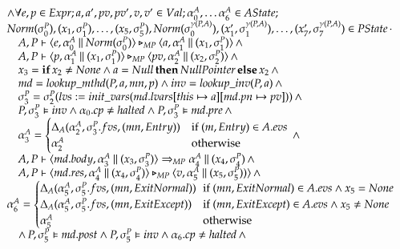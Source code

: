 \documentclass[a4paper,10pt]{article}
\begin{document}
\begin{displaymath}
\begin{array}{l}
\wedge
\forall e,p \in Expr; a,a',pv,pv',v,v' \in Val; \alpha^A_0,\ldots\alpha^A_6 \in AState;\\
Norm(\sigma_0^P),(x_1,\sigma_1^P), \ldots, (x_5, \sigma^P_5), Norm(\sigma_0^{\gamma(P,A)}), (x'_1,\sigma_1^{\gamma(P,A)}),\ldots,(x'_7,\sigma^{\gamma(P,A)}_7) \in PState
\,\cdot\\
\quad A, P \vdash \langle e,\alpha_0^A \mathbin{\|} Norm(\sigma_0^P) \rangle \triangleright_{MP} \langle a, \alpha^A_1 \mathbin{\|} (x_1, \sigma_1^P) \rangle \,\wedge\\
\quad A, P \vdash \langle p, \alpha^A_1 \mathbin{\|} (x_1, \sigma_1^P) \rangle \triangleright_{MP} \langle pv, \alpha^A_2 \mathbin{\|} (x_2, \sigma^P_2) \rangle \,\wedge\\
\quad x_3 = \textbf{if}\, x_2 \neq None \wedge a = Null\, \textbf{then}\, NullPointer\, \textbf{else}\, x_2 \,\wedge\\
\quad md = lookup\_mthd(P, a, mn, p) \wedge inv = lookup\_inv(P, a) \,\wedge\\
\quad \sigma^P_3 = \sigma^P_2(lvs:=init\_vars(md.lvars[this \mapsto a][md.pn \mapsto pv])) \,\wedge\\
\quad P, \sigma^P_3 \vDash inv \wedge \alpha_0.cp \neq halted \wedge P, \sigma^P_3 \vDash md.pre \,\wedge\\
\quad \alpha^A_3 = \begin{cases}
\Delta_A(\alpha^A_2, \sigma^P_3.fvs, (mn, Entry))& \text{if } (m, Entry) \in A.evs\\
\alpha^A_2& \text{otherwise}
\end{cases} \,\wedge\\
\quad A, P \vdash \langle md.body, \alpha^A_3 \mathbin{\|} (x_3, \sigma^P_3) \rangle \Rightarrow_{MP} \alpha^A_4 \mathbin{\|} (x_4, \sigma^P_4)
\,\wedge\\
\quad A, P \vdash \langle md.res, \alpha^A_4 \mathbin{\|} (x_4, \sigma^P_4) \rangle \triangleright_{MP} \langle v, \alpha^A_5 \mathbin{\|} (x_5, \sigma^P_5)) \rangle
\,\wedge\\
\alpha^A_6 = \begin{cases}
\Delta_A(\alpha^A_5, \sigma^P_5.fvs, (mn, ExitNormal))\!\!\!& \text{if } (mn, ExitNormal) \in A.evs \wedge x_5
= None\\
\Delta_A(\alpha^A_5, \sigma^P_5.fvs, (mn, ExitExcept))& \text{if } (mn, ExitExcept) \in A.evs \wedge x_5 \neq
None\\
\alpha^A_5& \text{otherwise}
\end{cases}\\
\quad \wedge\, P, \sigma^P_5 \vDash md.post \wedge P, \sigma^P_5 \vDash inv \wedge \alpha_6.cp \neq halted
\,\wedge\\

\end{array}
\end{displaymath}
\end{document}
